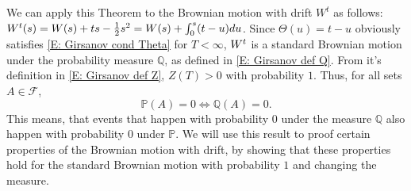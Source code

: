 We can apply this Theorem to the Brownian motion with drift $W^t$ as follows:
$W^t(s) = W(s) + ts - \frac{1}{2} s^2 = W(s) + \int_0^s (t-u)du $.
Since $\Theta(u) = t-u$ obviously satisfies \eqref{E: Girsanov cond Theta} for $T < \infty$,
$W^t$ is a standard Brownian motion under the probability measure $\mathbb{Q}$, 
as defined in \eqref{E: Girsanov def Q}. 
From it's definition in \eqref{E: Girsanov def Z}, $Z(T) > 0$ with probability $1$.
Thus, for all sets $A \in \mathcal{F}$,
\begin{equation} \label{E: P0 = Q0}
\mathbb{P}(A) = 0 \iff \mathbb{Q}(A) = 0.
\end{equation}
This means, that events that happen with probability $0$ under the measure $\mathbb{Q}$ also happen with probability $0$ under $\mathbb{P}$.
We will use this result to proof certain properties of the Brownian motion with drift,
by showing that these properties hold for the standard Brownian motion with probability $1$ and changing the measure.



